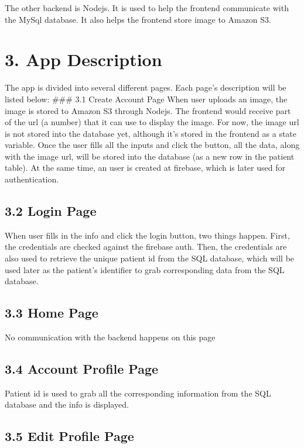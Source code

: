 \documentclass[]{book}
\begin{document}
The other backend is Nodejs. It is used to help the frontend communicate
with the MySql database. It also helps the frontend store image to
Amazon S3.

\section{3. App Description}\label{app-description}

The app is divided into several different pages. Each page's description
will be listed below: \#\#\# 3.1 Create Account Page When user uploads
an image, the image is stored to Amazon S3 through Nodejs. The frontend
would receive part of the url (a number) that it can use to display the
image. For now, the image url is not stored into the database yet,
although it's stored in the frontend as a state variable. Once the user
fills all the inputs and click the button, all the data, along with the
image url, will be stored into the database (as a new row in the patient
table). At the same time, an user is created at firebase, which is later
used for authentication.

\subsection{3.2 Login Page}\label{login-page}

When user fills in the info and click the login button, two things
happen. First, the credentials are checked against the firebase auth.
Then, the credentials are also used to retrieve the unique patient id
from the SQL database, which will be used later as the patient's
identifier to grab corresponding data from the SQL database.

\subsection{3.3 Home Page}\label{home-page}

No communication with the backend happens on this page

\subsection{3.4 Account Profile Page}\label{account-profile-page}

Patient id is used to grab all the corresponding information from the
SQL database and the info is displayed.

\subsection{3.5 Edit Profile Page}\label{edit-profile-page}
\end{document}
